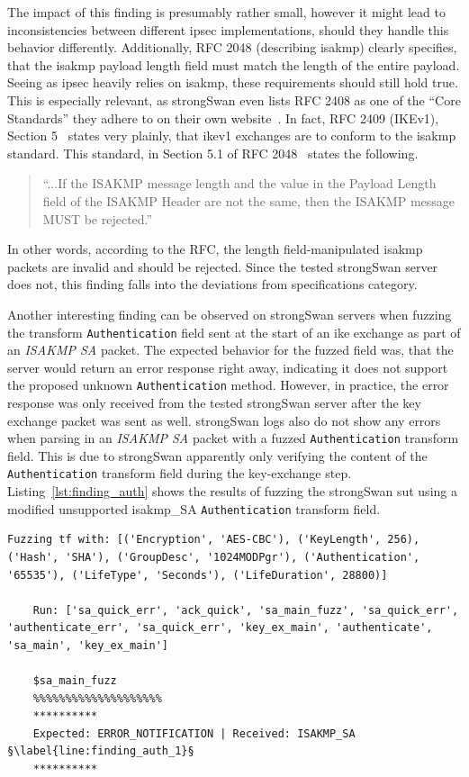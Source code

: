 The impact of this finding is presumably rather small, however it might lead to inconsistencies between different \ac{ipsec} implementations, should they handle this behavior differently. Additionally, RFC 2048 (describing \ac{isakmp}) clearly specifies, that the \ac{isakmp} payload length field must match the length of the entire payload. Seeing as \ac{ipsec} heavily relies on \ac{isakmp}, these requirements should still hold true. This is especially relevant, as strongSwan even lists RFC 2408 as one of the ``Core Standards'' they adhere to on their own website~\cite{strongswan-ietf}. In fact, RFC 2409 (IKEv1), Section 5~\cite{rfc:ikev1} states very plainly, that \ac{ike}v1 exchanges are to conform to the \ac{isakmp} standard.
This standard, in Section 5.1 of RFC 2048~\cite{rfc:isakmp} states the following. 

\begin{quotation}
	``...If the ISAKMP message length and the value in
	the Payload Length field of the ISAKMP Header are not the same, then
	the ISAKMP message MUST be rejected.''
\end{quotation}

In other words, according to the RFC, the length field-manipulated \ac{isakmp} packets are invalid and should be rejected. Since the tested strongSwan server does not, this finding falls into the deviations from specifications category. 

Another interesting finding can be observed on strongSwan servers when fuzzing the transform \texttt{Authentication} field sent at the start of an \ac{ike} exchange as part of an \emph{ISAKMP SA} packet. The expected behavior for the fuzzed field was, that the server would return an error response right away, indicating it does not support the proposed unknown \texttt{Authentication} method. However, in practice, the error response was only received from the tested strongSwan server after the key exchange packet was sent as well. strongSwan logs also do not show any errors when parsing in an \emph{ISAKMP SA} packet with a fuzzed \texttt{Authentication} transform field. This is due to strongSwan apparently only verifying the content of the \texttt{Authentication} transform field during the key-exchange step. Listing~\ref{lst:finding_auth} shows the results of fuzzing the strongSwan \ac{sut} using a modified unsupported \ac{isakmp}\_SA \texttt{Authentication} transform field. 

\begin{lstlisting}[float=h, caption=Discovered finding showing the Authentication field not being validated., label=lst:finding_auth, escapechar=§]
	Fuzzing tf with: [('Encryption', 'AES-CBC'), ('KeyLength', 256), ('Hash', 'SHA'), ('GroupDesc', '1024MODPgr'), ('Authentication', '65535'), ('LifeType', 'Seconds'), ('LifeDuration', 28800)]
	
	Run: ['sa_quick_err', 'ack_quick', 'sa_main_fuzz', 'sa_quick_err', 'authenticate_err', 'sa_quick_err', 'key_ex_main', 'authenticate', 'sa_main', 'key_ex_main']
	
	$sa_main_fuzz
	%%%%%%%%%%%%%%%%%%%%
	**********
	Expected: ERROR_NOTIFICATION | Received: ISAKMP_SA §\label{line:finding_auth_1}§
	**********
\end{lstlisting}

